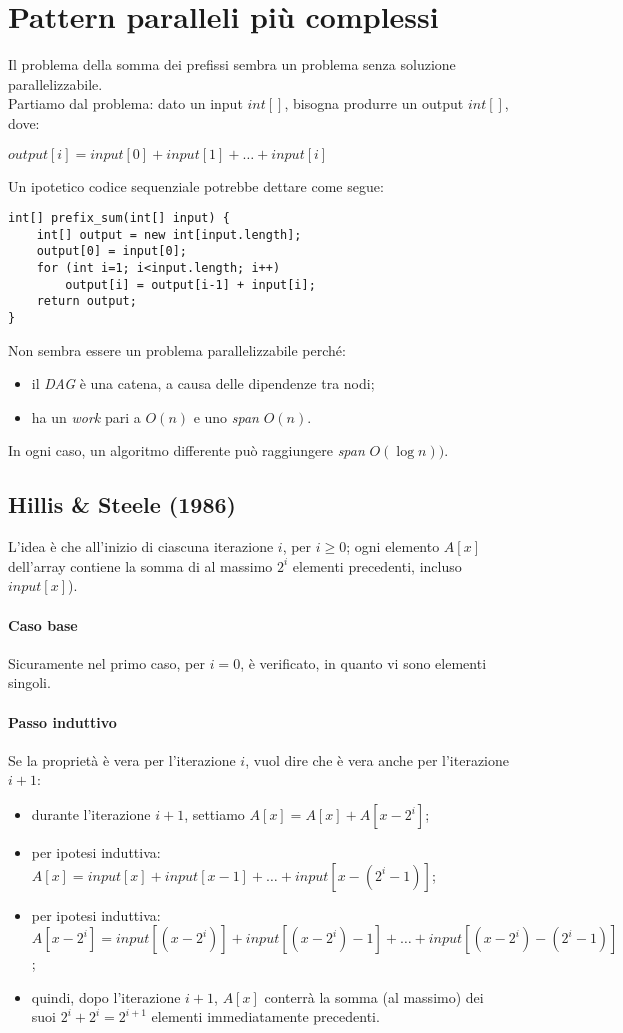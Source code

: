 \section{Pattern paralleli più complessi}
Il problema della somma dei prefissi sembra un problema senza soluzione parallelizzabile. \\
Partiamo dal problema: dato un input $int[]$, bisogna produrre un output $int[]$, dove:
\begin{center}
	$output[i] = input[0] + input[1] + \ldots + input[i]$
\end{center}
Un ipotetico codice sequenziale potrebbe dettare come segue:
\begin{lstlisting}
int[] prefix_sum(int[] input) {
	int[] output = new int[input.length];
	output[0] = input[0];
	for (int i=1; i<input.length; i++)
		output[i] = output[i-1] + input[i];
	return output;
}
\end{lstlisting}
Non sembra essere un problema parallelizzabile perché:
\begin{itemize}
	\item il \textit{DAG} è una catena, a causa delle dipendenze tra nodi;
	\item ha un \textit{work} pari a $O(n)$ e uno \textit{span} $O(n)$.
\end{itemize}
In ogni caso, un algoritmo differente può raggiungere \textit{span} $O(\log{n}))$.

\subsection{Hillis \& Steele (1986)}
L'idea è che all'inizio di ciascuna iterazione $i$, per $i \geq 0$; ogni elemento $A[x]$ dell'array contiene la somma di al massimo $2^{i}$ elementi precedenti, incluso $input[x]$). \\
\paragraph{Caso base}
Sicuramente nel primo caso, per $i=0$, è verificato, in quanto vi sono elementi singoli.
\paragraph{Passo induttivo}
Se la proprietà è vera per l'iterazione $i$, vuol dire che è vera anche per l'iterazione $i+1$:
\begin{itemize}
	\item durante l'iterazione $i+1$, settiamo $A[x] = A[x] + A[x-2^{i}]$;
	\item per ipotesi induttiva: $A[x] = input[x] + input[x-1] + \ldots + input[x-(2^{i}-1)]$;
	\item per ipotesi induttiva: $A[x-2^{i}] = input[(x-2^{i})] + input[(x-2^{i})-1] + \ldots + input[(x-2^{i})-(2^{i}-1)]$;
	\item quindi, dopo l'iterazione $i+1$, $A[x]$ conterrà la somma (al massimo) dei suoi $2^{i} + 2^{i} = 2^{i+1}$ elementi immediatamente precedenti.
\end{itemize}

